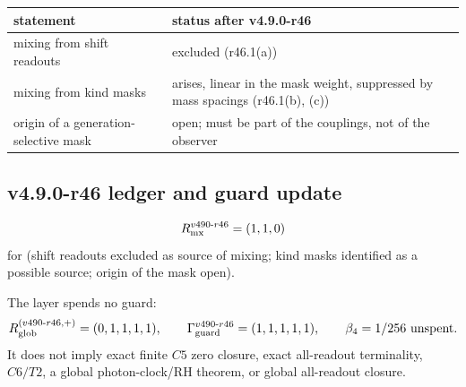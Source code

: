 \begin{center}
\small
\begin{tabular}{@{}>{\raggedright\arraybackslash}p{}>{\raggedright\arraybackslash}p{}@{}}
\toprule
statement & status after v4.9.0-r46\\
\midrule
mixing from shift readouts & excluded (r46.1(a))\\
mixing from kind masks & arises, linear in the mask weight, suppressed by mass spacings (r46.1(b), (c))\\
origin of a generation-selective mask & open; must be part of the couplings, not of the observer\\
\bottomrule
\end{tabular}
\end{center}

\subsection*{v4.9.0-r46 ledger and guard update}
\label{subsec:v490-r46-ledger-guard}

\[
R_{\rm mx}^{v490\text{-}r46}=(1,1,0)
\]
for (shift readouts excluded as source of mixing; kind masks identified as a possible source; origin of the mask open).

The layer spends no guard:
\[
R_{\rm glob}^{(v490\text{-}r46,+)}=(0,1,1,1,1),
\qquad
\Gamma_{\rm guard}^{v490\text{-}r46}=(1,1,1,1,1),
\qquad
\beta_4=1/256\ \text{unspent}.
\]
It does not imply exact finite \(C5\) zero closure, exact all-readout terminality,
\(C6/T2\), a global photon-clock/RH theorem, or global all-readout closure.
